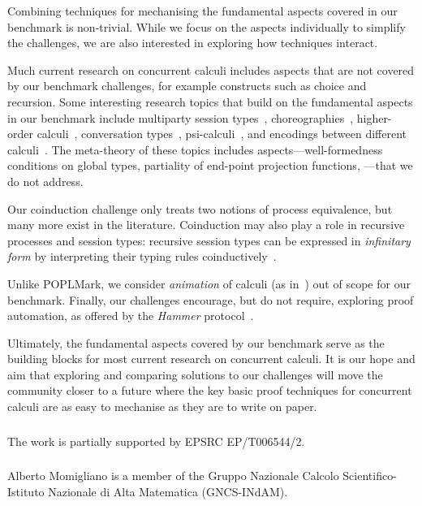 \documentclass[runningheads]{llncs}
\begin{document}
Combining techniques for mechanising the fundamental aspects covered in our benchmark is non-trivial.
While we focus on the aspects individually to simplify the challenges, we are also interested in exploring how techniques interact.

Much current research on concurrent calculi includes aspects that are
not covered by our benchmark challenges, for example constructs such as
choice and recursion.
Some interesting research topics that build on the
fundamental aspects in our benchmark include multiparty session
types~\cite{10.1145/2827695}, choreographies~\cite{Carbone2013},
higher-order calculi~\cite{Hirsch2022}, conversation
types~\cite{DBLP:journals/tcs/CairesV10}, psi-calculi~\cite{lmcs:696},
and encodings between different
calculi~\cite{DBLP:journals/iandc/Gorla10,DBLP:journals/iandc/DardhaGS17}.
The meta-theory of these topics includes aspects---\eg well-formedness conditions on
global types, partiality of end-point projection functions,
\etc---that we do not address.

Our coinduction challenge only treats two notions of process equivalence, but many more exist in the literature.
Coinduction may also play a role in recursive processes and session types: recursive session types can be expressed in \emph{infinitary form} by interpreting their typing rules coinductively~\cite{DerakhshanPfenning22,HornePadovani23}.

Unlike POPLMark, we consider \emph{animation} of calculi (as in~\cite{Castro-Perez2021}) out of scope for our benchmark.
Finally, our challenges encourage, but do not require, exploring proof automation, as offered by \eg the \emph{Hammer} protocol~\cite{BohmeN10,CzajkaK18}.

Ultimately, the fundamental aspects covered by our benchmark serve as the building blocks for most current research on concurrent calculi.
It is our hope and aim that exploring and comparing solutions to our challenges will move the community closer to a future where the key basic proof techniques for concurrent calculi are as easy to mechanise as they are to write on paper.

\begin{credits}
\subsubsection{\ackname}
The work is partially supported by EPSRC EP/T006544/2.

\subsubsection{\discintname}
Alberto Momigliano is a member of the Gruppo Nazionale Calcolo Scientifico-Istituto Nazionale di Alta Matematica (GNCS-INdAM).
\end{credits}




\end{document}
